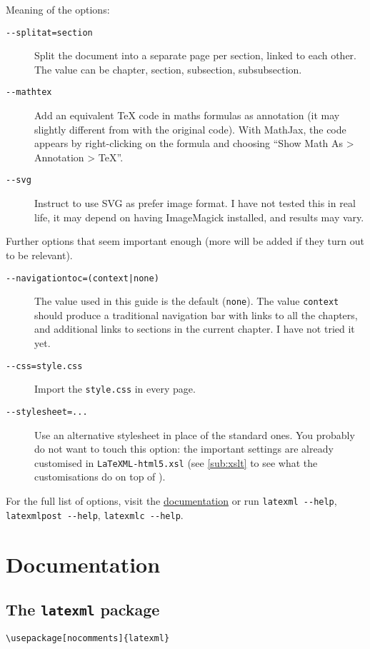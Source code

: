 \documentclass[a4paper]{article}
\theoremstyle{definition}
\begin{document}
Meaning of the options:
\begin{description}
  \item[\texttt{{-}{-}splitat=section}] Split the document into a separate \HTML{} page per section, linked to each other. The value can be chapter, section, subsection, subsubsection.
  \item[\texttt{{-}{-}mathtex}] Add an equivalent \TeX{} code in maths formulas as annotation (it may slightly different from with the original code). With MathJax, the code appears by right-clicking on the formula and choosing ``Show Math As > Annotation > TeX''.
  \item[\texttt{{-}{-}svg}] Instruct \LaTeXML{} to use SVG as prefer image format. I have not tested this in real life, it may depend on having ImageMagick installed, and results may vary.
\end{description}
Further options that seem important enough (more will be added if they turn out to be relevant).
\begin{description}
  \item[\texttt{{-}{-}navigationtoc=(context|none)}] The value used in this guide is the default (\verb|none|). The value \verb|context| should produce a traditional navigation bar with links to all the chapters, and additional links to sections in the current chapter. I have not tried it yet.
  \item[\texttt{{-}{-}css=style.css}] Import the \CSS{} \verb|style.css| in every page.
  \item[\texttt{{-}{-}stylesheet=...}] Use an alternative \XSLT{} stylesheet in place of the standard ones. You probably do not want to touch this option: the important settings are already customised in \verb|LaTeXML-html5.xsl| (see \autoref{sub:xslt} to see what the customisations do on top of \LaTeXML{}).
\end{description}
For the full list of options, visit the \href{https://dlmf.nist.gov/LaTeXML/docs.html}{\LaTeXML{} documentation} or run \verb|latexml --help|, \verb|latexmlpost --help|, \verb|latexmlc --help|.


\section{Documentation}

\subsection{The \texttt{latexml} package}
\begin{lstlisting}[style=latexml,caption={Import \texttt{latexml} in the preamble}]
  \usepackage[nocomments]{latexml}
\end{lstlisting}
\end{document}
